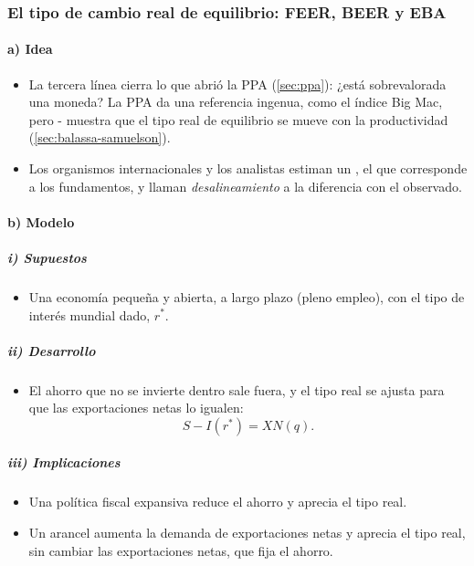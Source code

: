 \documentclass[11pt]{article}
\begin{document}
\subsubsection{El tipo de cambio real de equilibrio: FEER, BEER y EBA}\label{sec:equilibrio-real}

\paragraph{a) Idea}
\begin{itemize}
\item La tercera línea cierra lo que abrió la PPA (\ref{sec:ppa}): ¿está sobrevalorada una moneda? La PPA da una referencia ingenua, como el índice Big Mac, pero - muestra que el tipo real de equilibrio se mueve con la productividad (\ref{sec:balassa-samuelson}).
\item Los organismos internacionales y los analistas estiman un , el que corresponde a los fundamentos, y llaman \emph{desalineamiento} a la diferencia con el observado.
\end{itemize}

\paragraph{b) Modelo}
\subparagraph{i) Supuestos}
\begin{itemize}
\item Una economía pequeña y abierta, a largo plazo (pleno empleo), con el tipo de interés mundial dado, $r^*$\nocite{Mankiw2014Macroeconomia}.
\end{itemize}

\subparagraph{ii) Desarrollo}
\begin{itemize}
\item El ahorro que no se invierte dentro sale fuera, y el tipo real se ajusta para que las exportaciones netas lo igualen:
  \begin{equation}\label{eq:tcre-largo}
  S-I(r^*)=XN(q) .
  \end{equation}
\end{itemize}

\subparagraph{iii) Implicaciones}
\begin{itemize}
\item Una política fiscal expansiva reduce el ahorro y aprecia el tipo real.
\item Un arancel aumenta la demanda de exportaciones netas y aprecia el tipo real, sin cambiar las exportaciones netas, que fija el ahorro.
\end{itemize}
\end{document}

